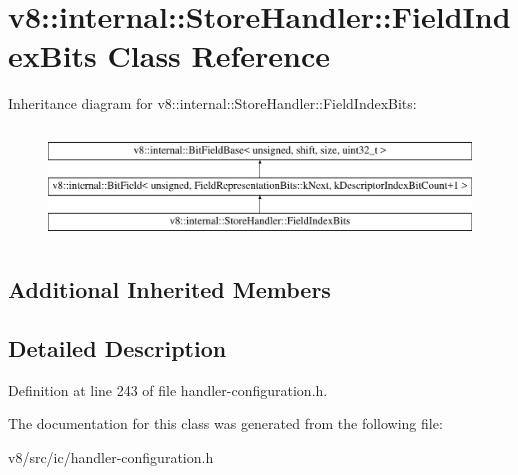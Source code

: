 \hypertarget{classv8_1_1internal_1_1StoreHandler_1_1FieldIndexBits}{}\section{v8\+:\+:internal\+:\+:Store\+Handler\+:\+:Field\+Index\+Bits Class Reference}
\label{classv8_1_1internal_1_1StoreHandler_1_1FieldIndexBits}
Inheritance diagram for v8\+:\+:internal\+:\+:Store\+Handler\+:\+:Field\+Index\+Bits\+:\begin{figure}[H]
\begin{center}
\leavevmode
\includegraphics[height=3.000000cm]{classv8_1_1internal_1_1StoreHandler_1_1FieldIndexBits}
\end{center}
\end{figure}
\subsection*{Additional Inherited Members}


\subsection{Detailed Description}


Definition at line 243 of file handler-\/configuration.\+h.



The documentation for this class was generated from the following file\+:\begin{DoxyCompactItemize}
\item 
v8/src/ic/handler-\/configuration.\+h\end{DoxyCompactItemize}
